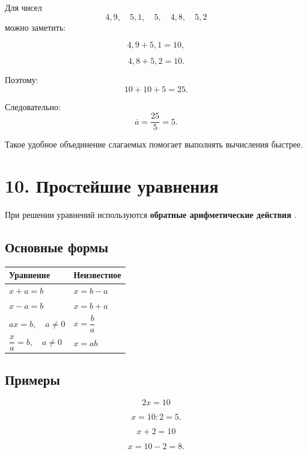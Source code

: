 \documentclass[a4paper,12pt]{article}
\newcommand{\sectiontitle}[1]{%
  \section*{\color{darkaccent}#1}%
}
\newcommand{\important}[1]{%
  \textbf{\color{darkaccent}#1}%
}
\begin{document}
Для чисел
\[
4{,}9,\quad5{,}1,\quad5,\quad4{,}8,\quad5{,}2
\]
можно заметить:

\[
4{,}9+5{,}1=10,
\]

\[
4{,}8+5{,}2=10.
\]

Поэтому:
\[
10+10+5=25.
\]

Следовательно:
\[
\overline a=\frac{25}{5}=5.
\]

Такое удобное объединение слагаемых помогает выполнять
вычисления быстрее.


\sectiontitle{10. Простейшие уравнения}

При решении уравнений используются
\important{обратные арифметические действия}.

\subsection*{\color{accent}Основные формы}

\renewcommand{\arraystretch}{1.4}

\begin{center}
\begin{tabularx}{0.88\linewidth}{
  >{\raggedright\arraybackslash}X
  >{\raggedright\arraybackslash}X
}
\toprule
Уравнение & Неизвестное \\
\midrule
\(x+a=b\) & \(x=b-a\) \\

\(x-a=b\) & \(x=b+a\) \\

\(ax=b,\quad a\ne0\) & \(x=\dfrac{b}{a}\) \\

\(\dfrac{x}{a}=b,\quad a\ne0\) & \(x=ab\) \\
\bottomrule
\end{tabularx}
\end{center}

\subsection*{\color{accent}Примеры}

\[
2x=10
\]

\[
x=10:2=5.
\]

\vspace{0.4em}

\[
x+2=10
\]

\[
x=10-2=8.
\]

\vspace{0.4em}
\end{document}
